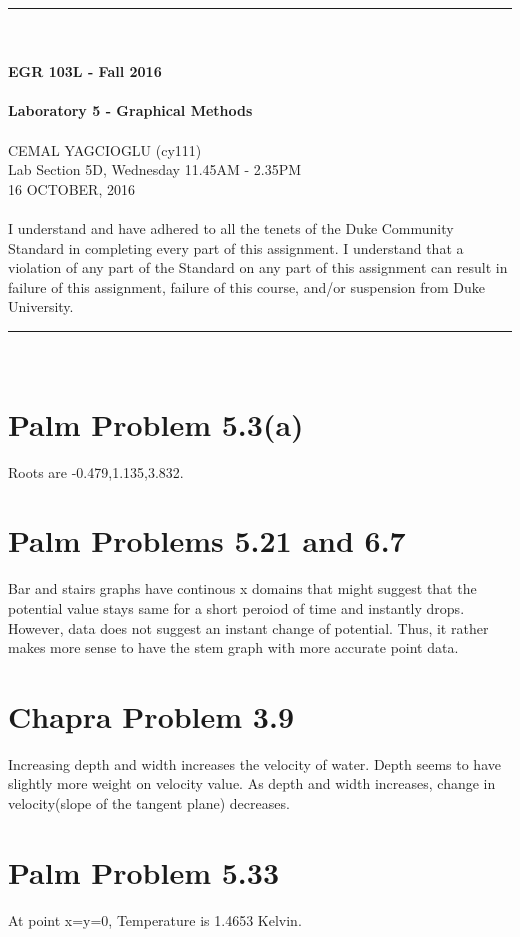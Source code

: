 \documentclass{article}
\begin{document}
\begin{center}
\rule{6.5in}{0.5mm}\\~\\
{\bf \large EGR 103L - Fall 2016}\\~\\
{\huge \bf Laboratory 5 - Graphical Methods}\\~\\
CEMAL YAGCIOGLU (cy111)\\
Lab Section 5D, Wednesday 11.45AM - 2.35PM\\
16 OCTOBER, 2016\\~\\
{\small I understand and have adhered to all the tenets of the Duke
  Community Standard in completing every part of this assignment.  I
  understand that a violation of any part of the Standard on any part
  of this assignment can result in failure of this assignment, failure
  of this course, and/or suspension from Duke University.} 
\rule{6.5in}{0.5mm}\\
\end{center}
\tableofcontents
\listoffigures
\pagebreak

\section{Palm Problem 5.3(a)}
Roots are -0.479,1.135,3.832.

\section{Palm Problems 5.21 and 6.7}
Bar and stairs graphs have  continous x domains that might suggest that the potential value stays same for a short peroiod of time and instantly drops. However, data does not suggest an instant change of potential. Thus, it rather makes more sense to have the stem graph with more accurate point data. 

\section{Chapra Problem 3.9}
Increasing depth and width increases the velocity of water. Depth seems to have slightly more weight on velocity value. As depth and width increases, change in velocity(slope of the tangent plane) decreases.  

\section{Palm Problem 5.33}
At point x=y=0, Temperature is 1.4653 Kelvin.
\end{document}
